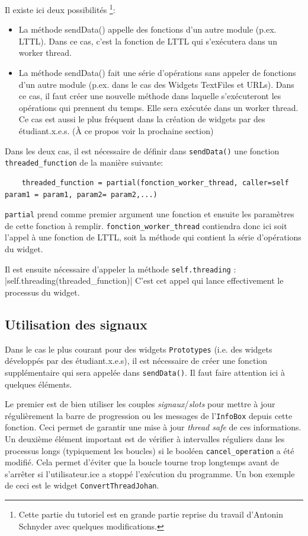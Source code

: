 \documentclass{article}
\begin{document}
{Il existe ici deux possibilités \footnote{Cette partie du tutoriel est en grande partie reprise du travail d'Antonin Schnyder avec quelques modifications.}:
\begin{itemize}
    \item La méthode sendData() appelle des fonctions d’un autre module (p.ex. LTTL). Dans ce cas, c'est la fonction de LTTL qui s’exécutera dans un worker thread.
    \item La méthode sendData() fait une série d’opérations sans appeler de fonctions d’un autre module (p.ex. dans le cas des Widgets TextFiles et URLs). Dans ce cas, il faut créer une nouvelle méthode dans laquelle s'exécuteront les opérations qui prennent du temps. Elle sera exécutée dans un worker thread. Ce cas est aussi le plus fréquent dans la création de widgets par des étudiant.x.e.s. (À ce propos voir la prochaine section)
\end{itemize}

Dans les deux cas, il est nécessaire de définir dans \texttt{sendData()} une fonction \texttt{threaded\_function} de la manière suivante: 

\begin{verbatim}
    threaded_function = partial(fonction_worker_thread, caller=self param1 = param1, param2= param2,...)
\end{verbatim}

\texttt{partial} prend comme premier argument une fonction et ensuite les paramètres de cette fonction à remplir. \texttt{fonction\_worker\_thread} contiendra donc ici soit l'appel à une fonction de LTTL, soit la méthode qui contient la série d'opérations du widget.

Il est ensuite nécessaire d'appeler la méthode \texttt{self.threading} :
|self.threading(threaded_function)|
C'est cet appel qui lance effectivement le processus du widget.

\subsection{Utilisation des signaux}

Dans le cas le plus courant pour des widgets \texttt{Prototypes} (i.e. des widgets développés par des étudiant.x.e.s), il est nécessaire de créer une fonction supplémentaire qui sera appelée dans \texttt{sendData()}. Il faut faire attention ici à quelques éléments.

Le premier est de bien utiliser les couples \textit{signaux}/\textit{slots} pour mettre à jour régulièrement la barre de progression ou les messages de l'\texttt{InfoBox} depuis cette fonction. Ceci permet de garantir une mise à jour \textit{thread safe} de ces informations. 
Un deuxième élément important est de vérifier à intervalles réguliers dans les processus longs (typiquement les boucles) si le booléen \texttt{cancel\_operation} a été modifié. Cela permet d'éviter que la boucle tourne trop longtemps avant de s'arrêter si l'utilisateur.ice a stoppé l'exécution du programme. Un bon exemple de ceci est le widget \texttt{ConvertThreadJohan}.

}
\end{document}
